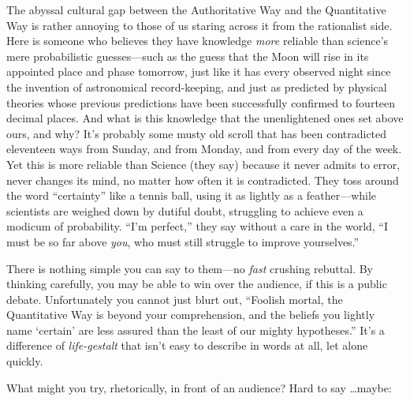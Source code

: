 {
 The abyssal cultural gap between the Authoritative Way and the
Quantitative Way is rather annoying to those of us staring across it
from the rationalist side. Here is someone who believes they have
knowledge \textit{more} reliable than science's mere
probabilistic guesses---such as the guess that the Moon will rise in
its appointed place and phase tomorrow, just like it has every observed
night since the invention of astronomical record-keeping, and just as
predicted by physical theories whose previous predictions have been
successfully confirmed to fourteen decimal places. And what is this
knowledge that the unenlightened ones set above ours, and why?
It's probably some musty old scroll that has been
contradicted eleventeen ways from Sunday, and from Monday, and from
every day of the week. Yet this is more reliable than Science (they
say) because it never admits to error, never changes its mind, no
matter how often it is contradicted. They toss around the word
``certainty'' like a tennis ball,
using it as lightly as a feather---while scientists are weighed down by
dutiful doubt, struggling to achieve even a modicum of probability.
``I'm perfect,''
they say without a care in the world, ``I must be so
far above \textit{you}, who must still struggle to improve
yourselves.''}

{
 There is nothing simple you can say to them---no \textit{fast}
crushing rebuttal. By thinking carefully, you may be able to win over
the audience, if this is a public debate. Unfortunately you cannot just
blurt out, ``Foolish mortal, the Quantitative Way is
beyond your comprehension, and the beliefs you lightly name
`certain' are less assured than the
least of our mighty hypotheses.''
It's a difference of \textit{life-gestalt} that
isn't easy to describe in words at all, let alone
quickly.}

{
 What might you try, rhetorically, in front of an audience? Hard to
say \ldots maybe:}

